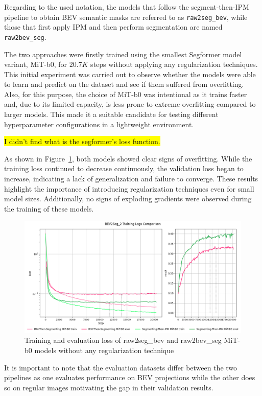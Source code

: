 Regarding to the used notation, the models that follow the segment-then-IPM pipeline to obtain BEV semantic masks are referred to as \texttt{raw2seg\_bev}, while those that first apply IPM and then perform segmentation are named \texttt{raw2bev\_seg}.

The two approaches were firstly trained using the smallest Segformer model variant, MiT-b0, for $20.7K$ steps without applying any regularization techniques. This initial experiment was carried out to observe whether the models were able to learn and predict on the dataset and see if them suffered from overfitting. Also, for this purpose, the choice of MiT-b0 was intentional as it trains faster and, due to its limited capacity, is less prone to extreme overfitting compared to larger models. This made it a suitable candidate for testing different hyperparameter configurations in a lightweight environment.

\hl{I didn't find what is the segformer's loss function.}

As shown in Figure~\ref{fig:overfitting_mit-b0}, both models showed clear signs of overfitting. While the training loss continued to decrease continuously, the validation loss began to increase, indicating a lack of generalization and failure to converge. These results highlight the importance of introducing regularization techniques even for small model sizes. Additionally, no signs of exploding gradients were observed during the training of these models.

\begin{figure}[h!]
    \centering
    \includegraphics[width=0.7\linewidth]{./images/experiments/overfitting_bev_nu.png}
    \caption{Training and evaluation loss of raw2seg\_bev and raw2bev\_seg MiT-b0 models without any regularization technique}
    \label{fig:overfitting_mit-b0}
\end{figure}

It is important to note that the evaluation datasets differ between the two pipelines as one evaluates performance on BEV projections while the other does so on regular images motivating the gap in their validation results.

